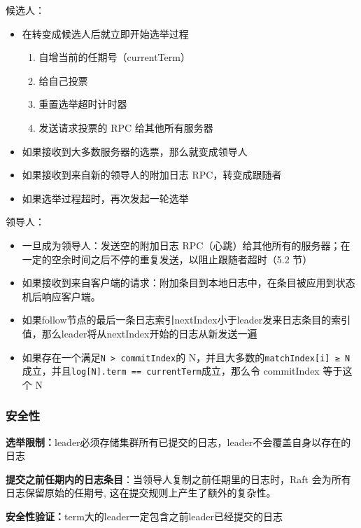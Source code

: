 \documentclass[
]{article}
\begin{document}
候选人：

\begin{itemize}
\item
  在转变成候选人后就立即开始选举过程

  \begin{enumerate}
  \def\labelenumi{\arabic{enumi}.}
  \item
    自增当前的任期号（currentTerm）
  \item
    给自己投票
  \item
    重置选举超时计时器
  \item
    发送请求投票的 RPC 给其他所有服务器
  \end{enumerate}
\item
  如果接收到大多数服务器的选票，那么就变成领导人
\item
  如果接收到来自新的领导人的附加日志 RPC，转变成跟随者
\item
  如果选举过程超时，再次发起一轮选举
\end{itemize}

领导人：

\begin{itemize}
\item
  一旦成为领导人：发送空的附加日志
  RPC（心跳）给其他所有的服务器；在一定的空余时间之后不停的重复发送，以阻止跟随者超时（5.2
  节）
\item
  如果接收到来自客户端的请求：附加条目到本地日志中，在条目被应用到状态机后响应客户端。
\item
  如果follow节点的最后一条日志索引nextIndex小于leader发来日志条目的索引值，那么leader将从nextIndex开始的日志从新发送一遍
\item
  如果存在一个满足\texttt{N\ \textgreater{}\ commitIndex}的
  N，并且大多数的\texttt{matchIndex{[}i{]}\ ≥\ N}成立，并且\texttt{log{[}N{]}.term\ ==\ currentTerm}成立，那么令
  commitIndex 等于这个 N
\end{itemize}

\hypertarget{header-n200}{%
\subsubsection{安全性}\label{header-n200}}

\textbf{选举限制：}leader必须存储集群所有已提交的日志，leader不会覆盖自身以存在的日志

\textbf{提交之前任期内的日志条目}：当领导人复制之前任期里的日志时，Raft
会为所有日志保留原始的任期号, 这在提交规则上产生了额外的复杂性。

\textbf{安全性验证：}term大的leader一定包含之前leader已经提交的日志
\end{document}
